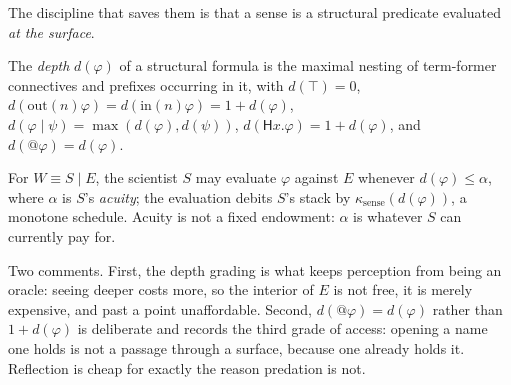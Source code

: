 The discipline that saves them is that a sense is a structural predicate evaluated \emph{at the
surface}.

\begin{definition}[Depth]\label{sci:depth}
The \emph{depth} $d(\varphi)$ of a structural formula is the maximal nesting of term-former
connectives and prefixes occurring in it, with $d(\top) = 0$, $d(\mathrm{out}(n)\varphi) =
d(\mathrm{in}(n)\varphi) = 1 + d(\varphi)$, $d(\varphi \mid \psi) = \max(d(\varphi), d(\psi))$,
$d(\mathsf{H}x.\varphi) = 1 + d(\varphi)$, and $d(@\varphi) = d(\varphi)$.
\end{definition}

\begin{definition}
\label{sci:def:sense}
For $W \equiv S \mid E$, the scientist $S$ may evaluate $\varphi$ against $E$ whenever
$d(\varphi) \le \alpha$, where $\alpha$ is $S$'s \emph{acuity}; the evaluation debits $S$'s stack by
$\kappa_{\mathrm{sense}}(d(\varphi))$, a monotone schedule. Acuity is not a fixed endowment: $\alpha$
is whatever $S$ can currently pay for.
\end{definition}

Two comments. First, the depth grading is what keeps perception from being an oracle: seeing deeper
costs more, so the interior of $E$ is not free, it is merely expensive, and past a point unaffordable.
Second, $d(@\varphi) = d(\varphi)$ rather than $1 + d(\varphi)$ is deliberate and records the third
grade of access: opening a name one holds is not a passage through a surface, because one already
holds it. Reflection is cheap for exactly the reason predation is not.

\begin{table}[t]
\centering
{}
\caption{The three grades of access. The ladder is also an ordering by invasiveness
(\S\ref{sci:sec:exposure}), and in the opposite direction.}
\label{sci:tab:access}
\end{table}

